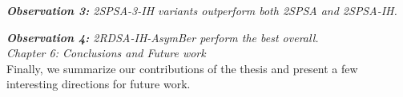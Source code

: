 \documentclass[12pt]{article}
\begin{document}
\textit{\textbf{Observation 3:} 2SPSA-3-IH variants outperform both 2SPSA and 2SPSA-IH.}

\textit{\textbf{Observation 4:} 2RDSA-IH-AsymBer perform the best overall.}\\
 
 \textit{Chapter 6: Conclusions and Future work}\\
 
Finally, we summarize our contributions of the thesis and present a few interesting directions for future work.

 
 


 


\end{document}

